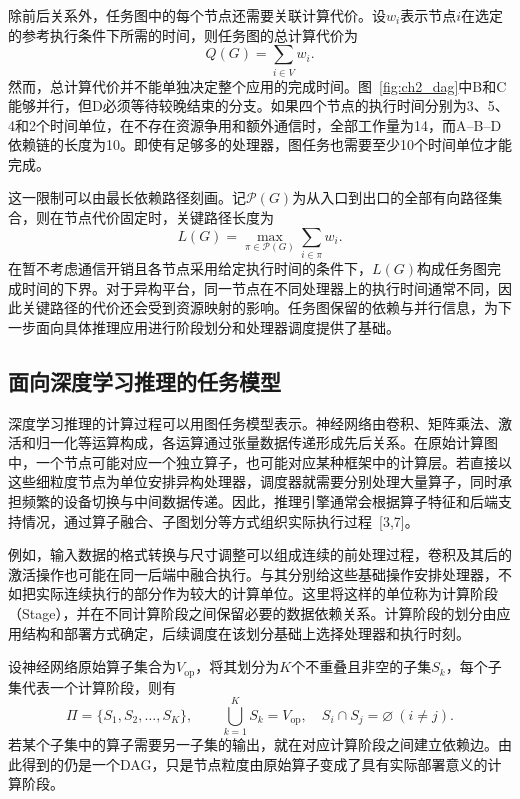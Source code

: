 除前后关系外，任务图中的每个节点还需要关联计算代价。设$w_i$表示节点$i$在选定的参考执行条件下所需的时间，则任务图的总计算代价为
\begin{equation}\label{eq:ch2-work}
  Q(G)=\sum_{i\in V}w_i.
\end{equation}
然而，总计算代价并不能单独决定整个应用的完成时间。图~\ref{fig:ch2_dag}中B和C能够并行，但D必须等待较晚结束的分支。如果四个节点的执行时间分别为3、5、4和2个时间单位，在不存在资源争用和额外通信时，全部工作量为14，而A--B--D依赖链的长度为10。即使有足够多的处理器，图任务也需要至少10个时间单位才能完成。

这一限制可以由最长依赖路径刻画。记$\mathcal P(G)$为从入口到出口的全部有向路径集合，则在节点代价固定时，关键路径长度为
\begin{equation}\label{eq:ch2-path}
  L(G)=\max_{\pi\in\mathcal P(G)}\sum_{i\in\pi}w_i.
\end{equation}
在暂不考虑通信开销且各节点采用给定执行时间的条件下，$L(G)$构成任务图完成时间的下界。对于异构平台，同一节点在不同处理器上的执行时间通常不同，因此关键路径的代价还会受到资源映射的影响。任务图保留的依赖与并行信息，为下一步面向具体推理应用进行阶段划分和处理器调度提供了基础。

\subsection{面向深度学习推理的任务模型}

深度学习推理的计算过程可以用图任务模型表示。神经网络由卷积、矩阵乘法、激活和归一化等运算构成，各运算通过张量数据传递形成先后关系。在原始计算图中，一个节点可能对应一个独立算子，也可能对应某种框架中的计算层。若直接以这些细粒度节点为单位安排异构处理器，调度器就需要分别处理大量算子，同时承担频繁的设备切换与中间数据传递。因此，推理引擎通常会根据算子特征和后端支持情况，通过算子融合、子图划分等方式组织实际执行过程~[3,7]。

例如，输入数据的格式转换与尺寸调整可以组成连续的前处理过程，卷积及其后的激活操作也可能在同一后端中融合执行。与其分别给这些基础操作安排处理器，不如把实际连续执行的部分作为较大的计算单位。这里将这样的单位称为计算阶段（Stage），并在不同计算阶段之间保留必要的数据依赖关系。计算阶段的划分由应用结构和部署方式确定，后续调度在该划分基础上选择处理器和执行时刻。

设神经网络原始算子集合为$V_{\mathrm{op}}$，将其划分为$K$个不重叠且非空的子集$S_k$，每个子集代表一个计算阶段，则有
\begin{equation}\label{eq:ch2-partition}
  \Pi=\{S_1,S_2,\ldots,S_K\},\qquad
  \bigcup_{k=1}^{K}S_k=V_{\mathrm{op}},\quad
  S_i\cap S_j=\varnothing\ (i\ne j).
\end{equation}
若某个子集中的算子需要另一子集的输出，就在对应计算阶段之间建立依赖边。由此得到的仍是一个DAG，只是节点粒度由原始算子变成了具有实际部署意义的计算阶段。

